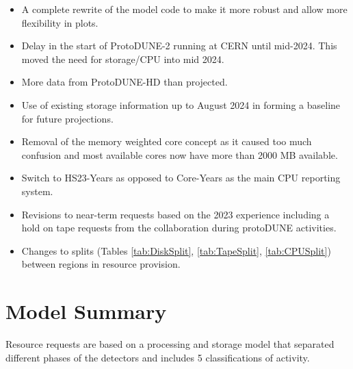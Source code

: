 \documentclass[12pt]{article}
\begin{document}
\begin{itemize}
\item A complete rewrite of the model code to make it more robust and allow more flexibility in plots. 
\item Delay in the start of ProtoDUNE-2 running at CERN until mid-2024. This moved the need for storage/CPU into mid 2024.  
\item More data from ProtoDUNE-HD than projected. 
\item Use of existing storage information up to August 2024 in forming a baseline for future projections. 
\item Removal of the memory weighted core concept as it caused too much confusion and most available cores now have more than 2000 MB available. 
\item Switch to HS23-Years as opposed to Core-Years as the main CPU reporting system.
\item Revisions to near-term requests based on the 2023 experience including a hold on tape requests from the collaboration during protoDUNE activities. 
\item Changes to splits (Tables \ref{tab:DiskSplit}, \ref{tab:TapeSplit}, \ref{tab:CPUSplit}) between regions in resource provision. 
\end{itemize}

\section{Model Summary}

Resource requests are based on a processing and storage model that separated different phases of the detectors and includes 5 classifications of activity.
\end{document}
